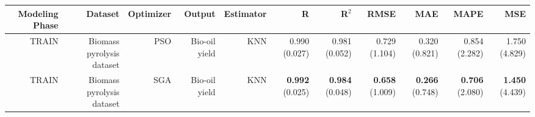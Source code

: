 \begin{table}
\centering
\label{eml___comparison_datasets_table_knn_biomass_pyrolysis_dataset_train.tex}
\begin{tabular}{rrrrrrrrrrr}
\toprule
Modeling Phase &                   Dataset & Optimizer &        Output & Estimator &                    R &                R$^2$ &                 RMSE &                  MAE &                 MAPE &                  MSE \\
\midrule
         TRAIN & Biomass pyrolysis dataset &       PSO & Bio-oil yield &       KNN &        0.990 (0.027) &        0.981 (0.052) &        0.729 (1.104) &        0.320 (0.821) &        0.854 (2.282) &        1.750 (4.829) \\
         TRAIN & Biomass pyrolysis dataset &       SGA & Bio-oil yield &       KNN & { \bf 0.992} (0.025) & { \bf 0.984} (0.048) & { \bf 0.658} (1.009) & { \bf 0.266} (0.748) & { \bf 0.706} (2.080) & { \bf 1.450} (4.439) \\
\bottomrule
\end{tabular}
\end{table}
